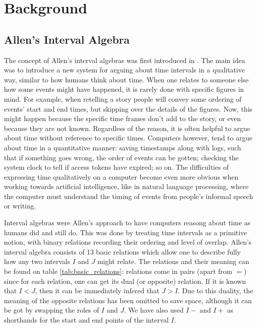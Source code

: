 \documentclass[../main.tex]{subfiles}
\begin{document}
\section{Background}%
\label{sec:background}

\subsection{Allen's Interval Algebra}%
\label{sub:allen_interval_algebras}

The concept of Allen's interval algebras was first introduced in \cite{allen83}. The main
idea was to introduce a new system for arguing about time intervals in a qualitative way, similar
to how humans think about time. When one relates to someone else how some events might have
happened, it is rarely done with specific figures in mind. For example, when retelling a story
people will convey some ordering of events' start and end times, but skipping over the details
of the figures. Now, this might happen because the specific time frames don't add to the
story, or even because they are not known. Regardless of the reason, it is often helpful to argue
about time without reference to specific times. Computers however, tend to argue about time in a
quantitative manner: saving timestamps along with logs, such that if something goes wrong, the
order of events can be gotten; checking the system clock to tell if access tokens have expired;
so on. The difficulties of expressing time qualitatively on a computer become even more obvious
when working towards artificial intelligence, like in natural language processing, where the
computer must understand the timing of events from people's informal speech or writing.

Interval algebras were Allen's approach to have computers reasong about time as humans did and
still do. This was done by treating time intervals as a primitive notion, with binary relations
recording their ordering and level of overlap. Allen's interval algebra consists of 13 basic
relations which allow one to describe fully how any two intervals $I$ and $J$ might relate. The
relations and their meaning can be found on table \ref{tab:basic_relations}: relations come in
pairs (apart from $=$) since for each relation, one can get its dual (or opposite) relation.
If it is known that \(I < J\), then it can be immediately infered that \(J > I\). Due to this
duality, the meaning of the opposite relations has been omitted to save space, although it can be
got by swapping the roles of $I$ and $J$. We have also used $I-$ and $I+$ as shorthands for the
start and end points of the interval $I$.
\end{document}
